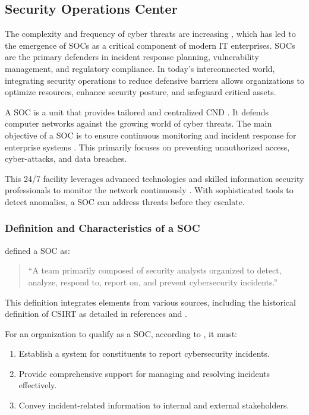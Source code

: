 \subsection{Security Operations Center} 

The complexity and frequency of cyber threats are increasing \parencite{Arianna2024}, which has led to the emergence of \gls{SOC}s as a critical component of modern IT enterprises. 
\gls{SOC}s are the primary defenders in incident response planning, vulnerability management, and regulatory compliance. 
In today's interconnected world, integrating security operations to reduce defensive barriers allows organizations to optimize resources, enhance security posture, and safeguard critical assets.

A \gls{SOC} is a unit \parencite{Rutledge2024} that provides tailored and centralized \gls{CND} \parencite{Zimmerman2014}. 
It defends computer networks against the growing world of cyber threats. 
The main objective of a \gls{SOC} is to ensure continuous monitoring and incident response for enterprise systems \parencite{Zimmerman2014}. 
This primarily focuses on preventing unauthorized access, cyber-attacks, and data breaches.

This 24/7 facility leverages advanced technologies and skilled information security professionals to monitor the network continuously \parencite{Zimmerman2014}. 
With sophisticated tools to detect anomalies, a \gls{SOC} can address threats before they escalate.

\subsubsection{Definition and Characteristics of a SOC}
\textcite{Zimmerman2014} defined a \gls{SOC} as:
\begin{quote}
    ``A team primarily composed of security analysts organized to detect, analyze, respond to, report on, and prevent cybersecurity incidents.''
\end{quote}

This definition integrates elements from various sources, including the historical definition of \gls{CSIRT} as detailed in references \parencite{Shirey2007} and \parencite{Brownlee1998}. 

For an organization to qualify as a \gls{SOC}, according to \textcite{Zimmerman2014}, it must:
\begin{enumerate}
    \item Establish a system for constituents to report cybersecurity incidents.
    \item Provide comprehensive support for managing and resolving incidents effectively.
    \item Convey incident-related information to internal and external stakeholders.
\end{enumerate}

